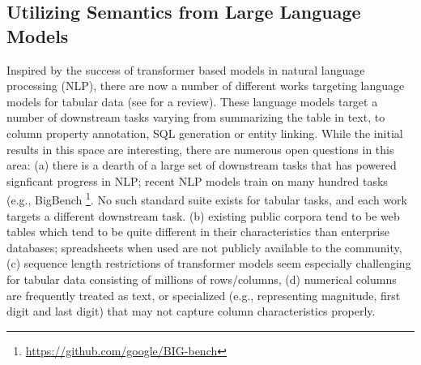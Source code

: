 \documentclass[sigconf, nonacm]{acmart}
\begin{document}
\subsection{Utilizing Semantics from Large Language Models}
Inspired by the success of transformer based models in natural language processing (NLP), there are now a number of different works targeting language models for tabular data (see \cite{ijcai2022p761} for a review).  These language models target a number of downstream tasks varying from summarizing the table in text, to column property annotation, SQL generation or entity linking.  While the initial results in this space are interesting, there are numerous open questions in this area: (a) there is a dearth of a large set of downstream tasks that has powered signficant progress in NLP; recent NLP models train on many hundred tasks (e.g., BigBench \footnote{\url{https://github.com/google/BIG-bench}}.  No such standard suite exists for tabular tasks, and each work targets a different downstream task. (b) existing public corpora tend to be web tables which tend to be quite different in their characteristics than enterprise databases; spreadsheets when used are not publicly available to the community, (c) sequence length restrictions of transformer models seem especially challenging for tabular data consisting of millions of rows/columns, (d) numerical columns are frequently treated as text, or specialized (e.g., representing magnitude, first digit and last digit) that may not capture column characteristics properly. 
\end{document}
